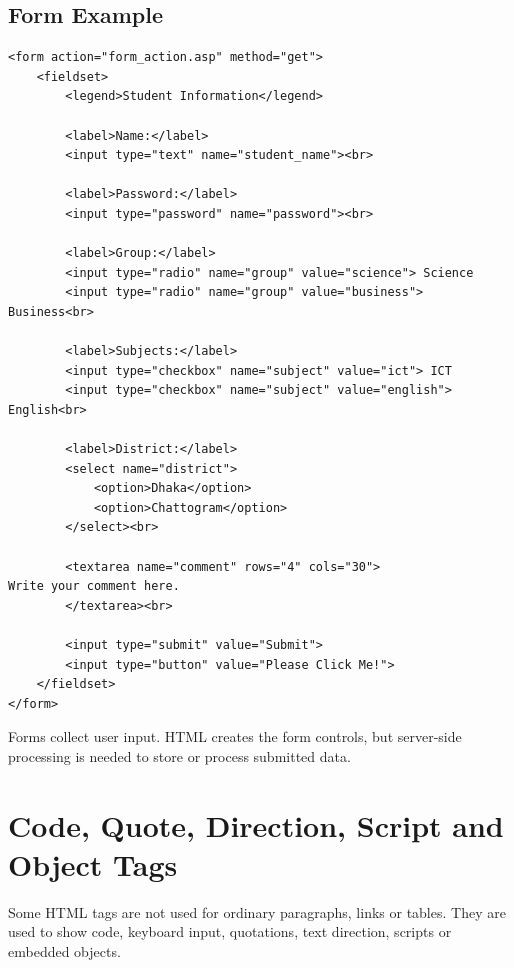 \subsection{Form Example}
\begin{lstlisting}[style=htmlide, caption={Complete Form Example}]
<form action="form_action.asp" method="get">
    <fieldset>
        <legend>Student Information</legend>

        <label>Name:</label>
        <input type="text" name="student_name"><br>

        <label>Password:</label>
        <input type="password" name="password"><br>

        <label>Group:</label>
        <input type="radio" name="group" value="science"> Science
        <input type="radio" name="group" value="business"> Business<br>

        <label>Subjects:</label>
        <input type="checkbox" name="subject" value="ict"> ICT
        <input type="checkbox" name="subject" value="english"> English<br>

        <label>District:</label>
        <select name="district">
            <option>Dhaka</option>
            <option>Chattogram</option>
        </select><br>

        <textarea name="comment" rows="4" cols="30">
Write your comment here.
        </textarea><br>

        <input type="submit" value="Submit">
        <input type="button" value="Please Click Me!">
    </fieldset>
</form>
\end{lstlisting}

\begin{summarybox}
Forms collect user input. HTML creates the form controls, but server-side processing is needed to store or process submitted data.
\end{summarybox}

\section{Code, Quote, Direction, Script and Object Tags}

Some HTML tags are not used for ordinary paragraphs, links or tables. They are used to show code, keyboard input, quotations, text direction, scripts or embedded objects.

